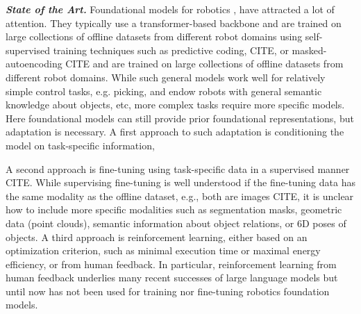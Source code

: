 \documentclass{erc-B2}
\begin{document}
\textit{\textbf{State of the Art.}} Foundational models for robotics \cite{rt12022arxiv, rt22023arxiv, rtx2023arxiv}, have attracted a lot of attention.
They typically use a transformer-based backbone and are trained on large collections of offline datasets from different robot domains using self-supervised training techniques such as predictive coding, CITE, or masked-autoencoding CITE and are trained on large collections of offline datasets from different robot domains. 
While such general models work well for relatively simple control tasks, e.g. picking, and endow robots with general semantic knowledge about objects, etc, more complex tasks require more specific models. 
Here foundational models can still provide prior foundational representations, but adaptation is necessary. 
A first approach to such adaptation is conditioning the model on task-specific information, 

A second approach is fine-tuning using task-specific data in a supervised manner CITE.
While supervising fine-tuning is well understood if the fine-tuning data has the same modality as the offline dataset, e.g., both are images CITE, it is unclear how to include more specific modalities such as segmentation masks, geometric data (point clouds), semantic information about object relations, or 6D poses of objects.
A third approach is reinforcement learning, either based on an optimization criterion, such as minimal execution time or maximal energy efficiency, or from human feedback. 
In particular, reinforcement learning from human feedback underlies many recent successes of large language models \cite{Ouyang2022InstructGPT} but until now has not been used for training nor fine-tuning robotics foundation models.
\end{document}
